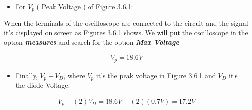 {\bfseries\itshape
\begin{itemize}
\item For $V_{p}$ ( Peak Voltage ) of Figure 3.6.1:
\end{itemize}} 

When the terminals of the oscilloscope are connected to the circuit and the signal it's displayed on screen as Figures 3.6.1 shows. We will put the oscilloscope in the option {\bfseries\itshape measures} and search for the option {\bfseries\itshape Max Voltage}. \hfill \break

\begin{ceqn}
\begin{align}
V_{p} = 18.6 V
\end{align}
\end{ceqn} \hfill 

{\bfseries\itshape
\begin{itemize}
\item Finally, $V_{p} - V_{D}$, where $V_{p}$ it's the peak voltage in Figure 3.6.1 and $V_{D}$ it's the diode Voltage:
\end{itemize}} \hfill

\begin{ceqn}
\begin{align}
V_{p} - ( 2 )V_{D} = 18.6 V - ( 2 )( 0.7 V ) = 17.2 V
\end{align}
\end{ceqn}

\pagebreak